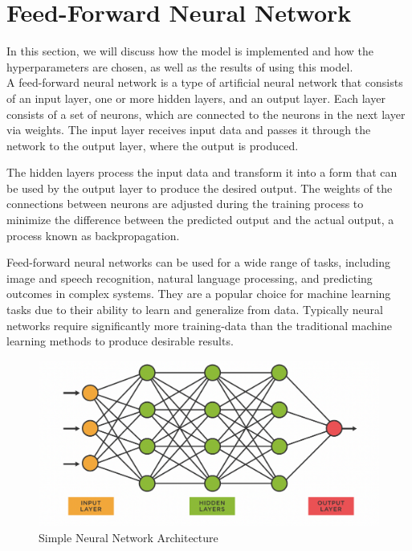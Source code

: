 \section{Feed-Forward Neural Network}
In this section, we will discuss how the  model is implemented and how the hyperparameters are chosen, as well as the results of using this model.\\

A feed-forward neural network is a type of artificial neural network that consists of an input layer, one or more hidden layers, and an output layer.
Each layer consists of a set of neurons, which are connected to the neurons in the next layer via weights.
The input layer receives input data and passes it through the network to the output layer, where the output is produced.

The hidden layers process the input data and transform it into a form that can be used by the output layer to produce the desired output.
The weights of the connections between neurons are adjusted during the training process to minimize the difference between the predicted output and the actual output, a process known as backpropagation.

Feed-forward neural networks can be used for a wide range of tasks, including image and speech recognition, natural language processing, and predicting outcomes in complex systems.
They are a popular choice for machine learning tasks due to their ability to learn and generalize from data.
Typically neural networks require significantly more training-data than the traditional machine learning methods to produce desirable results.
\\

\begin{figure}[H]
    \centering
    \includegraphics[scale=0.3]{figures_for_report/simple_neural_network}
    \captionsetup{justification=centering,margin=2cm}
    \caption{Simple Neural Network Architecture}
\end{figure}


